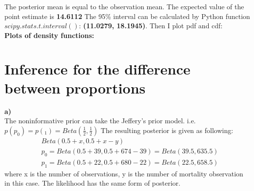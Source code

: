 \documentclass{article}
\begin{document}
The posterior mean is equal to the observation mean. The expected value of the point estimate is \textbf{14.6112} The 95\% interval can be calculated by Python function $scipy.stats.t.interval()$: \textbf{(11.0279, 18.1945)}. Then I plot pdf and cdf: \\

\textbf{Plots of density functions:}
\begin{figure}[H]
\centering  
{}
\label{Fig}
\end{figure}

\section{Inference for the difference between proportions}
\textbf{a)}\\

The noninformative prior can take the Jeffery's prior model. i.e. $p(p_0)=p(_1)=Beta(\frac{1}{2},\frac{1}{2})$ The resulting posterior is given as following:
\begin{equation}
\begin{aligned}
&Beta(0.5+x,0.5+x-y)\\
&p_0=Beta(0.5+39, 0.5+674-39)=Beta(39.5, 635.5)\\
&p_1=Beta(0.5+22, 0.5+680-22)=Beta(22.5, 658.5)
\end{aligned}
\end{equation}
where x is the number of observations, y is the number of mortality observation in this case. The likelihood has the same form of posterior.\\
\end{document}
